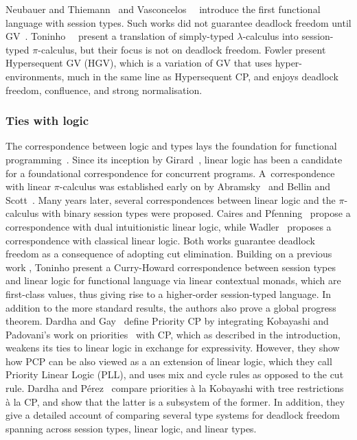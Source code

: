 Neubauer and Thiemann~\cite{neubauert04} and Vasconcelos~\etal~\cite{vasconcelosravara04,vasconcelosgay06} introduce the first functional language with session types. Such works did not guarantee deadlock freedom until GV~\cite{lindleymorris15,wadler14}.
Toninho~\etal~\cite{toninhocaires12} present a translation of simply-typed $\lambda$-calculus into session-typed $\pi$-calculus, but their focus is not on deadlock freedom.
Fowler \etal \cite{fowleretal21} present Hypersequent GV (HGV), which is a variation of GV that uses hyper-environments, much in the same line as Hypersequent CP, and enjoys deadlock freedom, confluence, and strong normalisation.

\subsubsection*{Ties with logic}
The correspondence between logic and types lays the foundation for functional programming~\cite{wadler15}.
Since its inception by Girard~\cite{girard87}, linear logic has been a candidate for a foundational correspondence for concurrent programs.
A~correspondence with linear $\pi$-calculus was established early on by Abramsky~\cite{abramsky94} and Bellin and Scott~\cite{bellinscott94}. Many years later, several correspondences between linear logic and the $\pi$-calculus with binary session types were proposed. Caires and Pfenning~\cite{cairespfenning10} propose a correspondence with dual intuitionistic linear logic, while Wadler~\cite{wadler12} proposes a correspondence with classical linear logic. Both works guarantee deadlock freedom as a consequence of adopting cut elimination.
Building on a previous work \cite{cairespfenning10}, Toninho \etal \cite{toninhoetal13} present a Curry-Howard correspondence between session types and linear logic for functional language via linear contextual monads, which are first-class values, thus giving rise to a higher-order session-typed  language. In addition to the more standard results, the authors also prove a global progress theorem.
Dardha and Gay~\cite{dardhagay18extended} define Priority CP by integrating Kobayashi and Padovani's work on priorities~\cite{kobayashi06,padovani14} with CP, which as described in the introduction, weakens its ties to linear logic in exchange for expressivity. However, they show how PCP can be also {viewed as} a an extension of linear logic, which they call Priority Linear Logic (PLL), and uses mix and cycle rules as opposed to the cut rule.
Dardha and P\'{e}rez~\cite{dardhaperez15extended,dardhaperez15,DardhaP22} compare priorities \`a la Kobayashi with tree restrictions \`a la CP, and show that the latter is a subsystem of the former. In addition, they give a detailed account of comparing several type systems for deadlock freedom spanning across session types, linear logic, and linear types.
